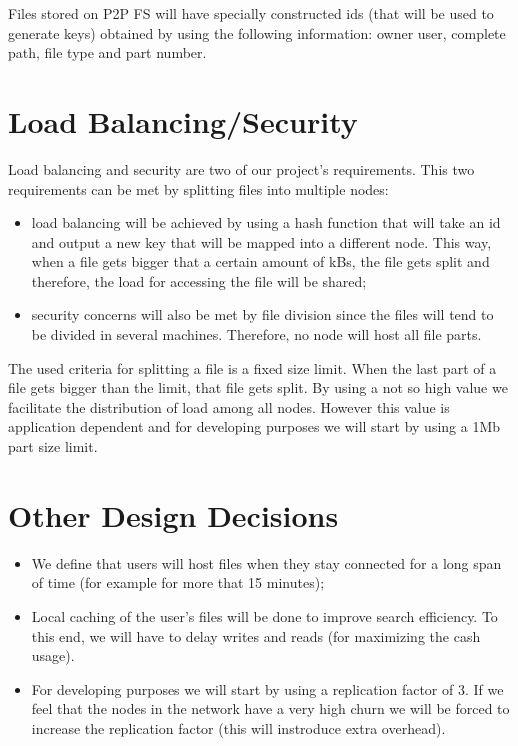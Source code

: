 \documentclass[times,9pt,article]{llncs}
\begin{document}
Files stored on P2P FS will have specially constructed ids (that will be used to
generate keys) obtained by using the following information: owner user, complete 
path, file type and part number.

\section{Load Balancing/Security}

Load balancing and security are two of our project's requirements. This two 
requirements can be met by splitting files into multiple nodes:
\begin{itemize}
\item load balancing will be achieved by using a hash function that will take
an id and output a new key that will be mapped into a different node. This way,
when a file gets bigger that a certain amount of kBs, the file gets split and
therefore, the load for accessing the file will be shared;
\item security concerns will also be met by file division since the files will
tend to be divided in several machines. Therefore, no node will host all file
parts.
\end{itemize}
The used criteria for splitting a file is a fixed size limit. When the last part
of a file gets bigger than the limit, that file gets split. By using a not so high
value we facilitate the distribution of load among all nodes. However this value
is application dependent and for developing purposes we will start by using a
1Mb part size limit.   

\section{Other Design Decisions}
\begin{itemize}
\item We define that users will host files when they stay connected for a long span of time (for example for more that 15 minutes);
\item Local caching of the user's files will be done to improve search efficiency.
To this end, we will have to delay writes and reads (for maximizing the cash usage).
\item For developing purposes we will start by using a replication factor of 3. If we feel that the nodes in the network
have a very high churn we will be forced to increase the replication factor (this will instroduce extra overhead).
\end{itemize}
\end{document}
